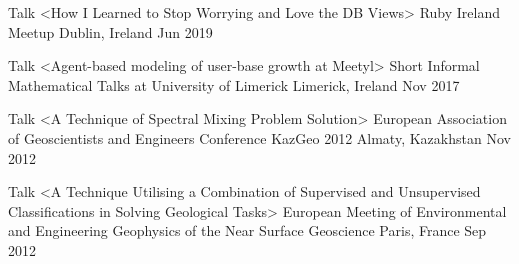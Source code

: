 \vspace{\acvSectionTopSkip}


\begin{cventries}

  \cvtalk
    {Talk <How I Learned to Stop Worrying and Love the DB Views>} %
    {Ruby Ireland Meetup} %
    {Dublin, Ireland} %
    {Jun 2019} %
    {}

  \cvtalk
    {Talk <Agent-based modeling of user-base growth at Meetyl>} %
    {Short Informal Mathematical Talks at University of Limerick} %
    {Limerick, Ireland} %
    {Nov 2017} %
    {}

  \cvtalk
    {Talk <A Technique of Spectral Mixing Problem Solution>} %
    {European Association of Geoscientists and Engineers Conference KazGeo 2012} %
    {Almaty, Kazakhstan} %
    {Nov 2012} %
    {}

  \cvtalk
    {Talk <A Technique Utilising a Combination of Supervised and Unsupervised Classifications in Solving Geological Tasks>} %
    {European Meeting of Environmental and Engineering Geophysics of the Near Surface Geoscience} %
    {Paris, France} %
    {Sep 2012} %
    {}

\end{cventries}

